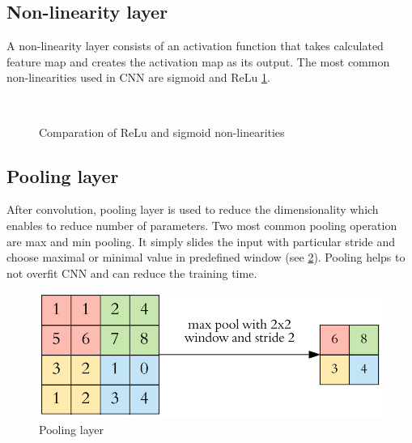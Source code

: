 \documentclass[twoside]{ctuthesis}
\theoremstyle{plain}
\theoremstyle{definition}
\theoremstyle{note}
\begin{document}
\subsection{Non-linearity layer}
A non-linearity layer consists of an activation function that takes calculated feature map and creates the activation map as its output. The most common non-linearities used in CNN are sigmoid and ReLu \ref{non-linearity}.
\begin{figure}[h]
\\
\caption{Comparation of ReLu and sigmoid non-linearities}
\label{non-linearity}
\end{figure}
\subsection{Pooling layer}
After convolution, pooling layer is used to reduce the dimensionality which enables to reduce number of parameters. Two most common pooling operation are max and min pooling. It simply slides the input with particular stride and choose maximal or minimal value in predefined window (see \ref{pooling}). Pooling helps to not overfit CNN and can reduce the training time.
\begin{figure}[h]
\caption{Pooling layer\cite{cs231n}}
\label{pooling}
\includegraphics[width=\textwidth]{images/neural_networks/pooling.png}
\end{figure}
\end{document}

